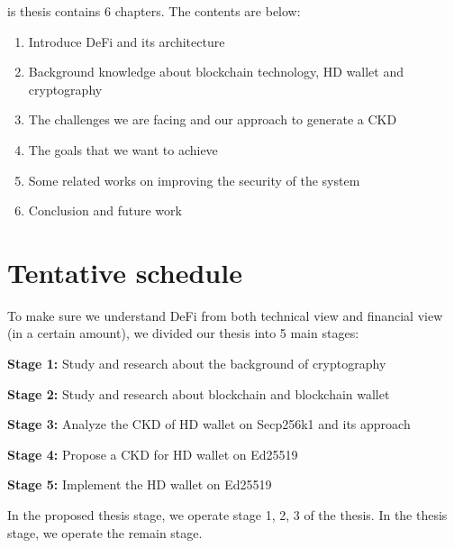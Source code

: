 is thesis contains 6 chapters. The contents are below:

\begin{enumerate}
  \item Introduce DeFi and its architecture
  \item Background knowledge about blockchain technology, HD wallet and cryptography
  \item The challenges we are facing and our approach to generate a CKD
  \item The goals that we want to achieve
  \item Some related works on improving the security of the system
  \item Conclusion and future work
\end{enumerate}

\section{Tentative schedule}

To make sure we understand DeFi from both technical view and financial view (in a certain amount), we divided our thesis into 5 main stages:

\textbf{Stage 1:} Study and research about the background of cryptography

\textbf{Stage 2:} Study and research about blockchain and blockchain wallet

\textbf{Stage 3:} Analyze the CKD of HD wallet on Secp256k1 and its approach

\textbf{Stage 4:} Propose a CKD for HD wallet on Ed25519

\textbf{Stage 5:} Implement the HD wallet on Ed25519

In the proposed thesis stage, we operate stage 1, 2, 3 of the thesis. In the thesis stage, we operate the remain stage.